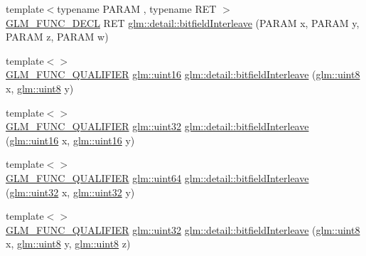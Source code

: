 \begin{DoxyCompactItemize}
\item 
{\footnotesize template$<$typename P\+A\+R\+AM , typename R\+ET $>$ }\\\hyperlink{setup_8hpp_ab2d052de21a70539923e9bcbf6e83a51}{G\+L\+M\+\_\+\+F\+U\+N\+C\+\_\+\+D\+E\+CL} R\+ET \hyperlink{namespaceglm_1_1detail_a606f6dc8c8314159fafef68f820c2c65}{glm\+::detail\+::bitfield\+Interleave} (P\+A\+R\+AM x, P\+A\+R\+AM y, P\+A\+R\+AM z, P\+A\+R\+AM w)
\item 
{\footnotesize template$<$$>$ }\\\hyperlink{setup_8hpp_a33fdea6f91c5f834105f7415e2a64407}{G\+L\+M\+\_\+\+F\+U\+N\+C\+\_\+\+Q\+U\+A\+L\+I\+F\+I\+ER} \hyperlink{group__gtc__type__precision_gad8c2939e1fdd8e5828b31d95c52255d5}{glm\+::uint16} \hyperlink{namespaceglm_1_1detail_ac59c574dc7900d87786f5a96f82ea6e7}{glm\+::detail\+::bitfield\+Interleave} (\hyperlink{group__gtc__type__precision_ga1a7dcd8aac97cc8020817c94049deff2}{glm\+::uint8} x, \hyperlink{group__gtc__type__precision_ga1a7dcd8aac97cc8020817c94049deff2}{glm\+::uint8} y)
\item 
{\footnotesize template$<$$>$ }\\\hyperlink{setup_8hpp_a33fdea6f91c5f834105f7415e2a64407}{G\+L\+M\+\_\+\+F\+U\+N\+C\+\_\+\+Q\+U\+A\+L\+I\+F\+I\+ER} \hyperlink{group__gtc__type__precision_ga202b6a53c105fcb7e531f9b443518451}{glm\+::uint32} \hyperlink{namespaceglm_1_1detail_ac5f2b38221d4447775e88f1b003f8113}{glm\+::detail\+::bitfield\+Interleave} (\hyperlink{group__gtc__type__precision_gad8c2939e1fdd8e5828b31d95c52255d5}{glm\+::uint16} x, \hyperlink{group__gtc__type__precision_gad8c2939e1fdd8e5828b31d95c52255d5}{glm\+::uint16} y)
\item 
{\footnotesize template$<$$>$ }\\\hyperlink{setup_8hpp_a33fdea6f91c5f834105f7415e2a64407}{G\+L\+M\+\_\+\+F\+U\+N\+C\+\_\+\+Q\+U\+A\+L\+I\+F\+I\+ER} \hyperlink{group__gtc__type__precision_gae3632bf9b37da66233d78930dd06378a}{glm\+::uint64} \hyperlink{namespaceglm_1_1detail_a7f40bc91b3d293fae0f7df8de85cdcc6}{glm\+::detail\+::bitfield\+Interleave} (\hyperlink{group__gtc__type__precision_ga202b6a53c105fcb7e531f9b443518451}{glm\+::uint32} x, \hyperlink{group__gtc__type__precision_ga202b6a53c105fcb7e531f9b443518451}{glm\+::uint32} y)
\item 
{\footnotesize template$<$$>$ }\\\hyperlink{setup_8hpp_a33fdea6f91c5f834105f7415e2a64407}{G\+L\+M\+\_\+\+F\+U\+N\+C\+\_\+\+Q\+U\+A\+L\+I\+F\+I\+ER} \hyperlink{group__gtc__type__precision_ga202b6a53c105fcb7e531f9b443518451}{glm\+::uint32} \hyperlink{namespaceglm_1_1detail_a27e9c62ce3ad180236573daec6a6461f}{glm\+::detail\+::bitfield\+Interleave} (\hyperlink{group__gtc__type__precision_ga1a7dcd8aac97cc8020817c94049deff2}{glm\+::uint8} x, \hyperlink{group__gtc__type__precision_ga1a7dcd8aac97cc8020817c94049deff2}{glm\+::uint8} y, \hyperlink{group__gtc__type__precision_ga1a7dcd8aac97cc8020817c94049deff2}{glm\+::uint8} z)

\end{DoxyCompactItemize}
